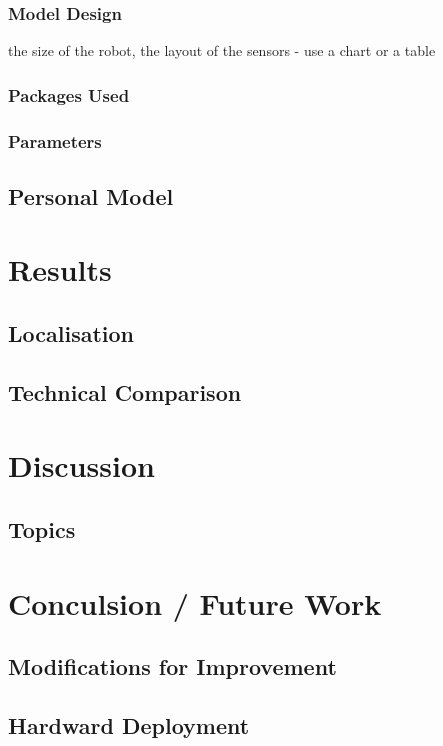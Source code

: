 \documentclass[a4paper]{article}
\begin{document}
\subsubsection{Model Design}
the size of the robot, the layout of the sensors - use a chart or a table

\subsubsection{Packages Used}


\subsubsection{Parameters}

\subsection{Personal Model}

\section{Results}
\subsection{Localisation}
\subsection{Technical Comparison}

\section{Discussion}

\subsection{Topics}

\section{Conculsion / Future Work}
\subsection{Modifications for Improvement}
\subsection{Hardward Deployment}
\end{document}
